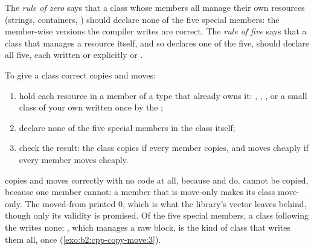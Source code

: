 \begin{definition}\label{def:b2:cpp-copy-move:rules}
The \emph{rule of zero} says that a class whose members all manage their own resources (strings,
containers, ) should declare none of the five special members: the member-wise versions the compiler
writes are correct. The \emph{rule of five} says that a class that manages a resource itself, and
so declares one of the five, should declare all five, each written or explicitly  or
.
\end{definition}

\begin{method}\label{met:b2:cpp-copy-move:rule-of-zero}
To give a class correct copies and moves:
\begin{enumerate}
\item hold each resource in a member of a type that already owns it: , ,
, or a small class of your own written once by the ;
\item declare none of the five special members in the class itself;
\item check the result: the class copies if every member copies, and moves cheaply if every member moves cheaply.
\end{enumerate}
\end{method}

\label{lst:b2:cpp-copy-move:rule-of-zero}

\label{out:b2:cpp-copy-move:rule-of-zero}

 copies and moves correctly with no code at all, because  and  do.
 cannot be copied, because one member cannot: a member that is move-only makes its class move-only. The
moved-from  printed 0, which is what the library's vector leaves behind, though only its validity is
promised. Of the five special members, a class following the  writes none; , which manages
a raw block, is the kind of class that writes them all, once (\cref{exo:b2:cpp-copy-move:3}).

